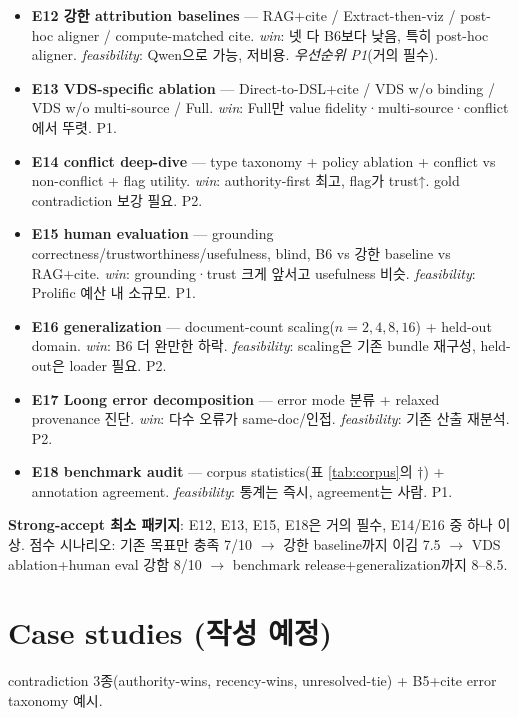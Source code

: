 \documentclass[11pt]{article}
\begin{document}
\begin{itemize}[leftmargin=*]
  \item \textbf{E12 강한 attribution baselines} — RAG+cite / Extract-then-viz / post-hoc aligner
  / compute-matched cite. \emph{win}: 넷 다 B6보다 낮음, 특히 post-hoc aligner. \emph{feasibility}:
  Qwen으로 가능, 저비용. \emph{우선순위 P1}(거의 필수).
  \item \textbf{E13 VDS-specific ablation} — Direct-to-DSL+cite / VDS w/o binding / VDS w/o
  multi-source / Full. \emph{win}: Full만 value fidelity·multi-source·conflict에서 뚜렷. P1.
  \item \textbf{E14 conflict deep-dive} — type taxonomy + policy ablation + conflict vs
  non-conflict + flag utility. \emph{win}: authority-first 최고, flag가 trust↑. gold contradiction
  보강 필요. P2.
  \item \textbf{E15 human evaluation} — grounding correctness/trustworthiness/usefulness, blind,
  B6 vs 강한 baseline vs RAG+cite. \emph{win}: grounding·trust 크게 앞서고 usefulness 비슷.
  \emph{feasibility}: Prolific 예산 내 소규모. P1.
  \item \textbf{E16 generalization} — document-count scaling($n{=}2,4,8,16$) + held-out domain.
  \emph{win}: B6 더 완만한 하락. \emph{feasibility}: scaling은 기존 bundle 재구성, held-out은
  loader 필요. P2.
  \item \textbf{E17 Loong error decomposition} — error mode 분류 + relaxed provenance 진단.
  \emph{win}: 다수 오류가 same-doc/인접. \emph{feasibility}: 기존 산출 재분석. P2.
  \item \textbf{E18 benchmark audit} — corpus statistics(표 \ref{tab:corpus}의 $\dagger$) +
  annotation agreement. \emph{feasibility}: 통계는 즉시, agreement는 사람. P1.
\end{itemize}

\textbf{Strong-accept 최소 패키지}: E12, E13, E15, E18은 거의 필수, E14/E16 중 하나 이상.
점수 시나리오: 기존 목표만 충족 7/10 $\rightarrow$ 강한 baseline까지 이김 7.5 $\rightarrow$ VDS
ablation+human eval 강함 8/10 $\rightarrow$ benchmark release+generalization까지 8--8.5.

\section{Case studies (작성 예정)}
contradiction 3종(authority-wins, recency-wins, unresolved-tie) + B5+cite error taxonomy 예시.
\end{document}
